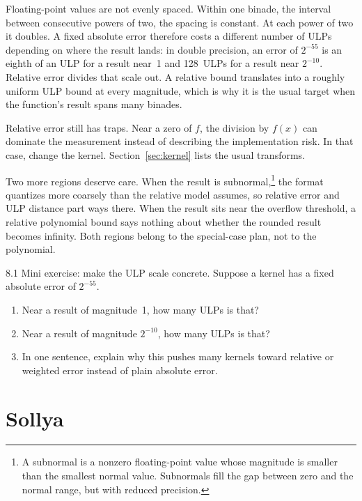 \documentclass[manuscript, nonacm]{acmart}
\begin{document}
    Floating-point values are not evenly spaced. Within one binade, the interval
    between consecutive powers of two, the spacing is constant. At each power of
    two it doubles. A fixed absolute error therefore costs a different number of
    ULPs depending on where the result lands: in double precision, an error of
    $2^{-55}$ is an eighth of an ULP for a result near~1 and 128~ULPs for a result
    near $2^{-10}$. Relative error divides that scale out. A relative bound
    translates into a roughly uniform ULP bound at every magnitude, which is why it
    is the usual target when the function's result spans many binades.

    Relative error still has traps. Near a zero of $f$, the division by $f(x)$
    can dominate the measurement instead of describing the implementation risk.
    In that case, change the kernel. Section~\ref{sec:kernel} lists the usual
    transforms.

    Two more regions deserve care. When the result is subnormal,\footnote{A subnormal is a nonzero floating-point value whose magnitude is smaller than the smallest normal value. Subnormals fill the gap between zero and the normal range, but with reduced precision.} the format
    quantizes more coarsely than the relative model assumes, so relative
    error and ULP distance part ways there. When the result sits near the
    overflow threshold, a relative polynomial bound says nothing about
    whether the rounded result becomes infinity. Both regions belong to the
    special-case plan, not to the polynomial.


    \begin{checkpoint}{8.1}
        Mini exercise: make the ULP scale concrete. Suppose a kernel has a fixed
        absolute error of $2^{-55}$.
        \begin{enumerate}
            \item Near a result of magnitude~1, how many ULPs is that?
            \item Near a result of magnitude $2^{-10}$, how many ULPs is that?
            \item In one sentence, explain why this pushes many kernels toward
            relative or weighted error instead of plain absolute error.
        \end{enumerate}
    \end{checkpoint}



    \section{Sollya}
\end{document}
